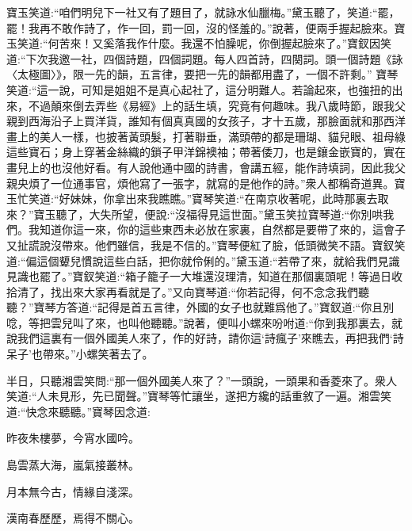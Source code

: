 \begin{parag}
    寶玉笑道:“咱們明兒下一社又有了題目了，就詠水仙臘梅。”黛玉聽了，笑道:“罷，罷！我再不敢作詩了，作一回，罰一回，沒的怪羞的。”說著，便兩手握起臉來。寶玉笑道:“何苦來！又奚落我作什麼。我還不怕臊呢，你倒握起臉來了。”寶釵因笑道:“下次我邀一社，四個詩題，四個詞題。每人四首詩，四闋詞。頭一個詩題《詠〈太極圖〉》，限一先的韻，五言律，要把一先的韻都用盡了，一個不許剩。” 寶琴笑道:“這一說，可知是姐姐不是真心起社了，這分明難人。若論起來，也強扭的出來，不過顛來倒去弄些《易經》上的話生填，究竟有何趣味。我八歲時節，跟我父親到西海沿子上買洋貨，誰知有個真真國的女孩子，才十五歲，那臉面就和那西洋畫上的美人一樣，也披著黃頭髮，打著聯垂，滿頭帶的都是珊瑚、貓兒眼、祖母綠這些寶石；身上穿著金絲織的鎖子甲洋錦襖袖；帶著倭刀，也是鑲金嵌寶的，實在畫兒上的也沒他好看。有人說他通中國的詩書，會講五經，能作詩填詞，因此我父親央煩了一位通事官，煩他寫了一張字，就寫的是他作的詩。”衆人都稱奇道異。寶玉忙笑道:“好妹妹，你拿出來我瞧瞧。”寶琴笑道:“在南京收著呢，此時那裏去取來？”寶玉聽了，大失所望，便說:“沒福得見這世面。”黛玉笑拉寶琴道:“你別哄我們。我知道你這一來，你的這些東西未必放在家裏，自然都是要帶了來的，這會子又扯謊說沒帶來。他們雖信，我是不信的。”寶琴便紅了臉，低頭微笑不語。寶釵笑道:“偏這個顰兒慣說這些白話，把你就伶俐的。”黛玉道:“若帶了來，就給我們見識見識也罷了。”寶釵笑道:“箱子籠子一大堆還沒理清，知道在那個裏頭呢！等過日收拾清了，找出來大家再看就是了。”又向寶琴道:“你若記得，何不念念我們聽聽？”寶琴方答道:“記得是首五言律，外國的女子也就難爲他了。”寶釵道:“你且別唸，等把雲兒叫了來，也叫他聽聽。”說著，便叫小螺來吩咐道:“你到我那裏去，就說我們這裏有一個外國美人來了，作的好詩，請你這‘詩瘋子’來瞧去，再把我們‘詩呆子’也帶來。”小螺笑著去了。
\end{parag}


\begin{parag}
    半日，只聽湘雲笑問:“那一個外國美人來了？”一頭說，一頭果和香菱來了。衆人笑道:“人未見形，先已聞聲。”寶琴等忙讓坐，遂把方纔的話重敘了一遍。湘雲笑道:“快念來聽聽。”寶琴因念道:
\end{parag}


\begin{poem}
    \begin{pl}昨夜朱樓夢，今宵水國吟。\end{pl}

    \begin{pl}島雲蒸大海，嵐氣接叢林。\end{pl}

    \begin{pl}月本無今古，情緣自淺深。\end{pl}

    \begin{pl}漢南春歷歷，焉得不關心。\end{pl}


\end{poem}


